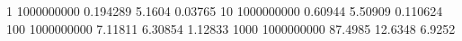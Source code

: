 1 1000000000 0.194289 5.1604 0.03765
10 1000000000 0.60944 5.50909 0.110624
100 1000000000 7.11811 6.30854 1.12833
1000 1000000000 87.4985 12.6348 6.9252
